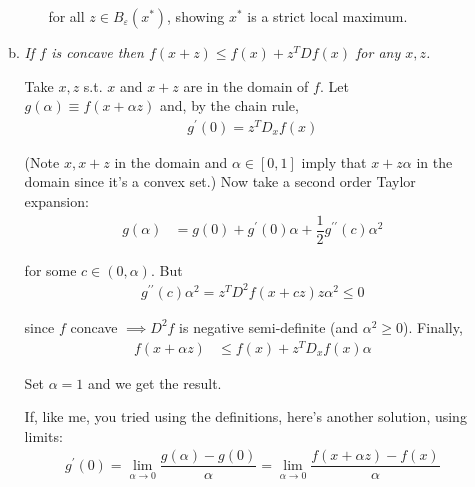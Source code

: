 \documentclass{article}
\begin{document}
\begin{enumerate}[1.]
\begin{enumerate}[a)]
\begin{enumerate}[i)]
            for all $z \in B_{\varepsilon}(x^*)$, showing $x^{*}$ is a strict local maximum.
        \end{enumerate}

      \item \textit{If $f$ is concave then $f(x + z) \le f(x) + z^T Df(x)$ for any $x, z$.}

        \solution Take $x, z$ s.t. $x$ and $x + z$ are in the domain of $f$. Let $g(\alpha) \equiv f(x + \alpha z)$ and, by the chain rule,
          \begin{align*}
            g^\prime(0)
            =
            z^T D_x f(x)
          \end{align*}

          (Note $x, x + z$ in the domain and $\alpha \in [0, 1]$ imply that $x + z\alpha$ in the domain since it's a convex set.) Now take a second order Taylor expansion:
          \begin{align*}
            g(\alpha)
            &
            =
            g(0)
            +
            g^{\prime}(0) \alpha
            +
            \dfrac{1}{2}
            g^{\prime\prime}(c) \alpha^2
          \end{align*}

          for some $c \in (0, \alpha)$. But
          \begin{align*}
            g^{\prime\prime}(c) \alpha^2
            =
            z^T D^2 f(x + cz) z \alpha^2 \le 0
          \end{align*}

          since $f$ concave $\implies D^2f$ is negative semi-definite (and $\alpha^2 \ge 0$). Finally,
          \begin{align*}
            f(x + \alpha z)
            &
            \le
            f(x)
            +
            z^T D_x f(x) \alpha
          \end{align*}

          Set $\alpha = 1$ and  we get the result. 

          \begin{remark}
          If, like me, you tried using the definitions, here's another solution, using limits:
          \begin{align*}
            g^\prime(0)
            =
            \lim_{\alpha \to 0}
            \dfrac{g(\alpha) - g(0)}{\alpha}
            =
            \lim_{\alpha \to 0}
            \dfrac{f(x + \alpha z) - f(x)}{\alpha}
          \end{align*}



\end{remark}
\end{enumerate}
\end{enumerate}
\end{document}
